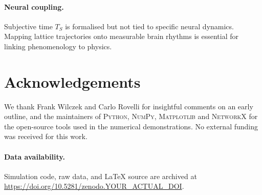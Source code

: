 \documentclass[11pt]{article}
\begin{document}
\paragraph{Neural coupling.}
Subjective time $T_S$ is formalised but not tied to specific neural
dynamics.  Mapping lattice trajectories onto measurable brain rhythms is
essential for linking phenomenology to physics.

\section*{Acknowledgements}
We thank Frank Wilczek and Carlo Rovelli for insightful
comments on an early outline, and the maintainers of \textsc{Python},
\textsc{NumPy}, \textsc{Matplotlib} and \textsc{NetworkX} for the
open-source tools used in the numerical demonstrations. No external
funding was received for this work.

\paragraph{Data availability.}
Simulation code, raw data, and LaTeX source are archived at
\url{https://doi.org/10.5281/zenodo.YOUR_ACTUAL_DOI}.



\end{document}
